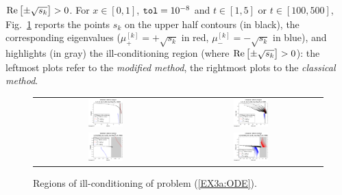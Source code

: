 \documentclass[a4paper,10pt]{report}%
\begin{document}
${\rm Re}\left[\pm\sqrt{s_k}\right]>0$.
For $x\in[0,1]$, ${\tt tol}=10^{-8}$ and $t\in[1,5]$ or $t\in[100,500]$, Fig.~\ref{EX3a_a} reports the
points $s_k$ on the upper half contours (in black), the corresponding eigenvalues ($\mu^{[k]}_+=+\sqrt{s_k}$
in red, $\mu^{[k]}_-=-\sqrt{s_k}$ in blue), and highlights (in gray) the ill-conditioning region (where
${\rm Re}\left[\pm\sqrt{s_k}\right]>0$): the leftmost plots refer to the {\em modified method}, the
rightmost plots to the {\em classical method}.
\begin{figure}[htb]
\centering
\begin{tabular}{cc}
\includegraphics[width=0.25\textwidth]{./FIGS/EX3a/EX3a_illcond_tol2_t1_Talbot1.eps} &
\includegraphics[width=0.25\textwidth]{./FIGS/EX3a/EX3a_illcond_tol2_t1_Talbot2.eps} \\
\includegraphics[width=0.25\textwidth]{./FIGS/EX3a/EX3a_illcond_tol2_t100_Talbot1.eps} &
\includegraphics[width=0.25\textwidth]{./FIGS/EX3a/EX3a_illcond_tol2_t100_Talbot2.eps}
\end{tabular}
\caption{\small Regions of ill-conditioning of problem (\ref{EX3a:ODE}).}
\label{EX3a_a}
\end{figure}
\end{document}
